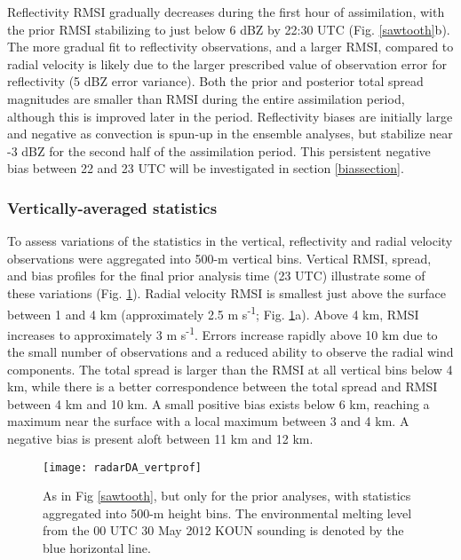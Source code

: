 Reflectivity RMSI gradually decreases during the first hour of assimilation, with the prior RMSI stabilizing to just below 6 dBZ by 22:30 UTC (Fig. \ref{sawtooth}b). The more gradual fit to reflectivity observations, and a larger RMSI, compared to radial velocity is likely due to the larger prescribed value of observation error for reflectivity (5 dBZ error variance). Both the prior and posterior total spread magnitudes are smaller than RMSI during the entire assimilation period, although this is improved later in the period. Reflectivity biases are initially large and negative as convection is spun-up in the ensemble analyses, but stabilize near -3 dBZ for the second half of the assimilation period. This persistent negative bias between 22 and 23 UTC will be investigated in section \ref{biassection}.

\subsubsection{Vertically-averaged statistics}
To assess variations of the statistics in the vertical, reflectivity and radial velocity observations were aggregated into 500-m vertical bins. Vertical RMSI, spread, and bias profiles for the final prior analysis time (23 UTC) illustrate some of these variations (Fig. \ref{vertprof}). Radial velocity RMSI is smallest just above the surface between 1 and 4 km (approximately 2.5 m s\textsuperscript{-1}; Fig. \ref{vertprof}a). Above 4 km, RMSI increases to approximately 3 m s\textsuperscript{-1}. Errors increase rapidly above 10 km due to the small number of observations and a reduced ability to observe the radial wind components. The total spread is larger than the RMSI at all vertical bins below 4 km, while there is a better correspondence between the total spread and RMSI between 4 km and 10 km. A small positive bias exists below 6 km, reaching a maximum near the surface with a local maximum between 3 and 4 km. A negative bias is present aloft between 11 km and 12 km.

\begin{figure}
\centering
\texttt{[image: radarDA\_vertprof]}
\caption{As in Fig \ref{sawtooth}, but only for the prior analyses, with statistics aggregated into 500-m height bins. The environmental melting level from the 00 UTC 30 May 2012 KOUN sounding is denoted by the blue horizontal line.}
\label{vertprof}
\end{figure}

